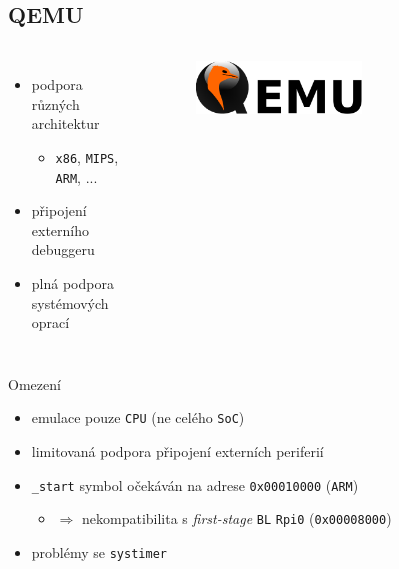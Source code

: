\documentclass[compress]{beamer}
\begin{document}
\subsection{QEMU}

\begin{frame}
	\begin{columns}
		\begin{itemize}
			\item podpora různých architektur
			\begin{itemize}
				\item \texttt{x86}, \texttt{MIPS}, \texttt{ARM}, ...
			\end{itemize}
			\item připojení externího debuggeru
			\item plná podpora systémových oprací
		\end{itemize}
		\begin{figure}
			\centering
			\includegraphics[width=0.6\textwidth]{img/Qemu_logo.pdf}
			\caption{\href{https://www.qemu.org}{}}
			\label{QEMU}
		\end{figure}
	\end{columns}
	\vspace{0.4cm}
	\noindent\makebox[\linewidth]{\rule{\textwidth}{0.4pt}}
	\begin{block}{Omezení}
		\begin{itemize}
			\item emulace pouze \texttt{CPU} (ne celého \texttt{SoC})
			\item limitovaná podpora připojení externích periferií
			\item \texttt{\_start} symbol očekáván na adrese \texttt{0x00010000} (\texttt{ARM})
			\begin{itemize}
				\item $\Rightarrow$ nekompatibilita s \textit{first-stage} \texttt{BL} \texttt{Rpi0} (\texttt{0x00008000})
			\end{itemize}
			\item problémy se \texttt{systimer}
		\end{itemize}
	\end{block}
\end{frame}
\end{document}
